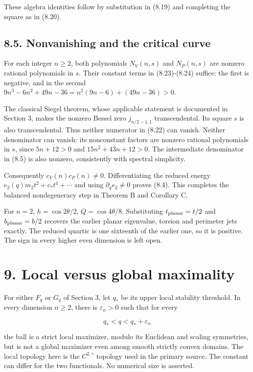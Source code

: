 \documentclass[11pt]{article}
\begin{document}
These algebra identities follow by substitution in (8.19) and completing
the square as in (8.20).

\subsection{8.5. Nonvanishing and the critical
curve}\label{nonvanishing-and-the-critical-curve}

For each integer \(n\ge2\), both polynomials \(N_V(n,s)\) and
\(N_P(n,s)\) are nonzero rational polynomials in \(s\). Their constant
terms in (8.23)-(8.24) suffice: the first is negative, and in the second
\(9n^3-6n^2+49n-36=n^2(9n-6)+(49n-36)>0\).

The classical Siegel theorem, whose applicable statement is documented
in Section 3, makes the nonzero Bessel zero \(j_{n/2-1,1}\)
transcendental. Its square \(s\) is also transcendental. Thus neither
numerator in (8.22) can vanish. Neither denominator can vanish: its
nonconstant factors are nonzero rational polynomials in \(s\), since
\(5n+12>0\) and \(15n^2+43n+12>0\). The intermediate denominator in
(8.5) is also nonzero, consistently with spectral simplicity.

Consequently \(c_V(n)c_P(n)\ne0\). Differentiating the reduced energy
\(e_2(q)m_2t^2+c_*t^4+\cdots\) and using \(\partial_qe_2\ne0\) proves
(8.4). This completes the balanced nondegeneracy step in Theorem B and
Corollary C.

For \(n=2\), \(h=\cos2\theta/2\), \(Q=\cos4\theta/8\). Substituting
\(t_{\rm planar}=t/2\) and \(b_{\rm planar}=b/2\) recovers the earlier
planar eigenvalue, torsion and perimeter jets exactly. The reduced
quartic is one sixteenth of the earlier one, so it is positive. The sign
in every higher even dimension is left open.

\section{9. Local versus global
maximality}\label{local-versus-global-maximality}

For either \(F_q\) or \(G_q\) of Section 3, let \(q_*\) be its upper
local stability threshold. In every dimension \(n\ge2\), there is
\(\varepsilon_n>0\) such that for every

\[
q_*<q<q_*+\varepsilon_n
\tag{9.1}
\]

the ball is a strict local maximizer, modulo its Euclidean and scaling
symmetries, but is not a global maximizer even among smooth strictly
convex domains. The local topology here is the \(C^{2,\gamma}\) topology
used in the primary source. The constant can differ for the two
functionals. No numerical size is asserted.
\end{document}
